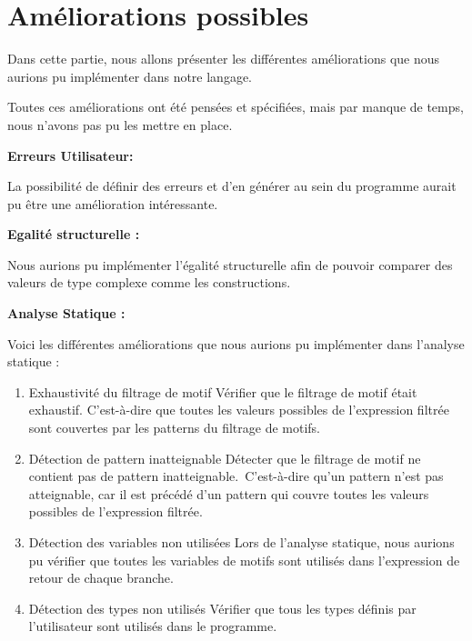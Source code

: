\documentclass[
  12pt,
]{article}
\begin{document}
\section{Améliorations possibles}\label{amuxe9liorations-possibles}

Dans cette partie, nous allons présenter les différentes améliorations
que nous aurions pu implémenter dans notre langage.

Toutes ces améliorations ont été pensées et spécifiées, mais par manque
de temps, nous n'avons pas pu les mettre en place.

\textbf{Erreurs Utilisateur:}

La possibilité de définir des erreurs et d'en générer au sein du
programme aurait pu être une amélioration intéressante.

\textbf{Egalité structurelle :}

Nous aurions pu implémenter l'égalité structurelle afin de pouvoir
comparer des valeurs de type complexe comme les constructions.

\textbf{Analyse Statique :}

Voici les différentes améliorations que nous aurions pu implémenter dans
l'analyse statique :

\begin{enumerate}
      \item
            Exhaustivité du filtrage de motif
            Vérifier que le filtrage de motif était exhaustif. C'est-à-dire que toutes les valeurs possibles de l’expression filtrée sont couvertes par les patterns du filtrage de motifs.
      \item
            Détection de pattern inatteignable
            Détecter que le filtrage de motif ne contient pas de pattern inatteignable.\
            C'est-à-dire qu'un pattern n'est pas atteignable, car il est précédé d'un pattern qui couvre toutes les valeurs possibles de l'expression filtrée.
      \item
            Détection des variables non utilisées
            Lors de l'analyse statique, nous aurions pu vérifier que toutes les variables de motifs sont utilisés dans l'expression de retour de chaque branche.
      \item
            Détection des types non utilisés
            Vérifier que tous les types définis par l'utilisateur sont utilisés dans le programme.
\end{enumerate}
\end{document}
